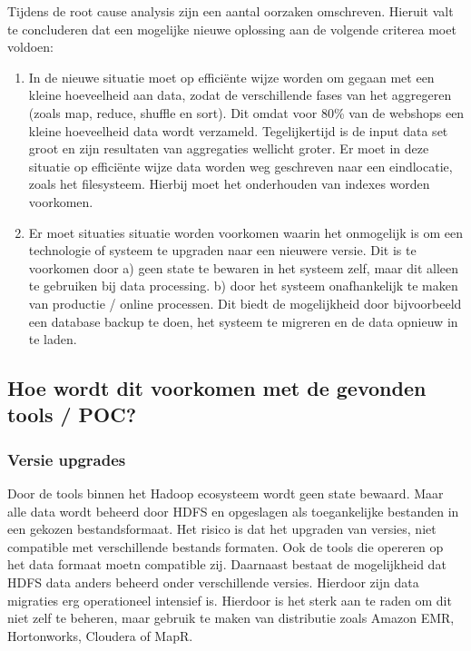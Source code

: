 Tijdens de root cause analysis zijn een aantal oorzaken omschreven. Hieruit valt te concluderen dat een mogelijke nieuwe oplossing aan de volgende criterea moet voldoen:

\begin{enumerate}[label=(\alph*)]

    \item In de nieuwe situatie moet op efficiënte wijze worden om gegaan met een kleine hoeveelheid aan data, zodat de verschillende fases van het aggregeren (zoals map, reduce, shuffle en sort). Dit omdat voor 80\% van de webshops een kleine hoeveelheid data wordt verzameld. Tegelijkertijd is de input data set groot en zijn resultaten van aggregaties wellicht groter. Er moet in deze situatie op efficiënte wijze data worden weg geschreven naar een eindlocatie,  zoals het filesysteem. Hierbij moet het onderhouden van indexes worden voorkomen.
    
    \item Er moet situaties situatie worden voorkomen waarin het onmogelijk is om een technologie of systeem te upgraden naar een nieuwere versie. Dit is te voorkomen door a) geen state te bewaren in het systeem zelf, maar dit alleen te gebruiken bij data processing. b) door het systeem onafhankelijk te maken van productie / online processen. Dit biedt de mogelijkheid door bijvoorbeeld een database backup te doen, het systeem te migreren en de data opnieuw in te laden.
\end{enumerate}

\clearpage


\subsection{Hoe wordt dit voorkomen met de gevonden tools / POC?}
\label{subsec:deelvraag3_vergelijking}


\subsubsection{\textbf{Versie upgrades}}

Door de tools binnen het Hadoop ecosysteem wordt geen state bewaard. Maar alle data wordt beheerd door HDFS en opgeslagen als toegankelijke bestanden in een gekozen bestandsformaat. Het risico is dat het upgraden van versies, niet compatible met verschillende bestands formaten. Ook de tools die opereren op het data formaat moetn compatible zij. Daarnaast bestaat de mogelijkheid dat HDFS data anders beheerd onder verschillende versies. Hierdoor zijn data migraties erg operationeel intensief is. Hierdoor is het sterk aan te raden om dit niet zelf te beheren, maar gebruik te maken van distributie zoals Amazon EMR, Hortonworks, Cloudera of MapR.

